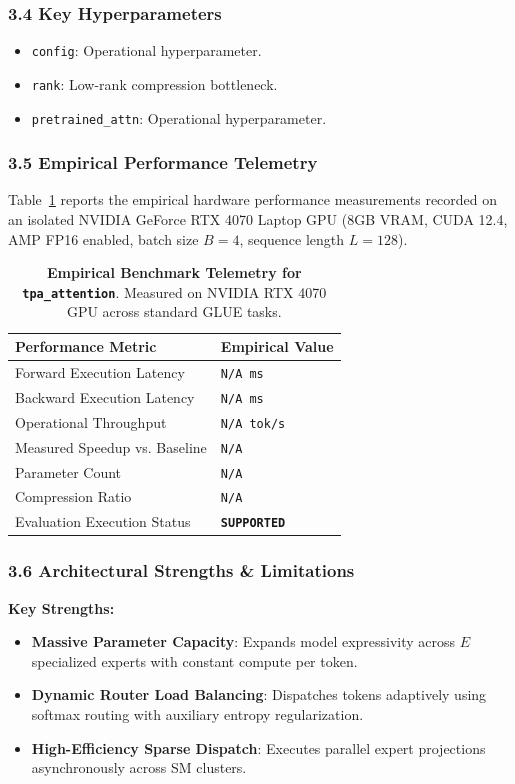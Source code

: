 \subsubsection*{3.4 Key Hyperparameters}
\begin{itemize}
    \item \texttt{config}: Operational hyperparameter.
    \item \texttt{rank}: Low-rank compression bottleneck.
    \item \texttt{pretrained\_attn}: Operational hyperparameter.
\end{itemize}

\subsubsection*{3.5 Empirical Performance Telemetry}
Table~\ref{tab:telemetry_tpa\_attention} reports the empirical hardware performance measurements recorded on an isolated NVIDIA GeForce RTX 4070 Laptop GPU (8GB VRAM, CUDA 12.4, AMP FP16 enabled, batch size $B=4$, sequence length $L=128$).

\begin{table}[h]
\centering
\small
\caption{\textbf{Empirical Benchmark Telemetry for \texttt{tpa\_attention}}. Measured on NVIDIA RTX 4070 GPU across standard GLUE tasks.}
\label{tab:telemetry_tpa\_attention}
\begin{tabularx}{\columnwidth}{lX}
\toprule
\textbf{Performance Metric} & \textbf{Empirical Value} \\
\midrule
Forward Execution Latency & \texttt{N/A ms} \\
Backward Execution Latency & \texttt{N/A ms} \\
Operational Throughput & \texttt{N/A tok/s} \\
Measured Speedup vs. Baseline & \texttt{N/A} \\
Parameter Count & \texttt{N/A} \\
Compression Ratio & \texttt{N/A} \\
Evaluation Execution Status & \textbf{\texttt{SUPPORTED}} \\
\bottomrule
\end{tabularx}
\end{table}

\subsubsection*{3.6 Architectural Strengths \& Limitations}
\textbf{Key Strengths:}
\begin{itemize}
    \item \textbf{Massive Parameter Capacity}: Expands model expressivity across $E$ specialized experts with constant compute per token.
    \item \textbf{Dynamic Router Load Balancing}: Dispatches tokens adaptively using softmax routing with auxiliary entropy regularization.
    \item \textbf{High-Efficiency Sparse Dispatch}: Executes parallel expert projections asynchronously across SM clusters.
\end{itemize}

